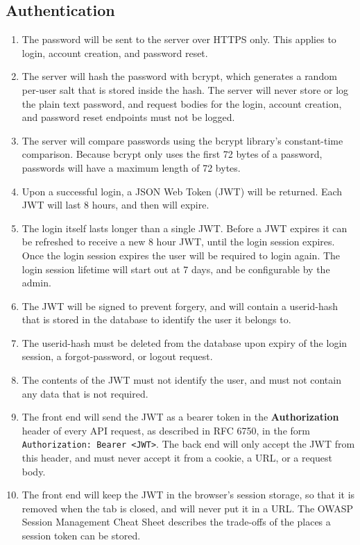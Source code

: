     \subsection{Authentication}
        \begin{enumerate}[leftmargin=3\parindent]
            \item The password will be sent to the server over HTTPS only. This applies to login, account creation, and password reset.
            \item The server will hash the password with bcrypt, which generates a random per-user salt that is stored inside the hash. The server will never store or log the plain text password, and request bodies for the login, account creation, and password reset endpoints must not be logged.
            \item The server will compare passwords using the bcrypt library's constant-time comparison. Because bcrypt only uses the first 72 bytes of a password, passwords will have a maximum length of 72 bytes.
            \item Upon a successful login, a JSON Web Token (JWT) will be returned. Each JWT will last 8 hours, and then will expire.
            \item The login itself lasts longer than a single JWT. Before a JWT expires it can be refreshed to receive a new 8 hour JWT, until the login session expires. Once the login session expires the user will be required to login again. The login session lifetime will start out at 7 days, and be configurable by the admin.
            \item The JWT will be signed to prevent forgery, and will contain a userid-hash that is stored in the database to identify the user it belongs to.
            \item The userid-hash must be deleted from the database upon expiry of the login session, a forgot-password, or logout request.
            \item The contents of the JWT must not identify the user, and must not contain any data that is not required.
            \item The front end will send the JWT as a bearer token in the \textbf{Authorization} header of every API request, as described in RFC 6750, in the form \texttt{Authorization: Bearer <JWT>}. The back end will only accept the JWT from this header, and must never accept it from a cookie, a URL, or a request body.
            \item The front end will keep the JWT in the browser's session storage, so that it is removed when the tab is closed, and will never put it in a URL. The OWASP Session Management Cheat Sheet describes the trade-offs of the places a session token can be stored.

\end{enumerate}
